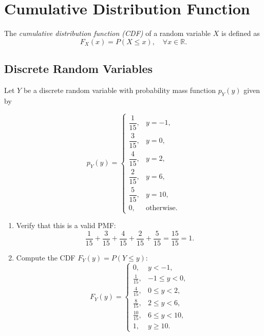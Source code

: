 \section{Cumulative Distribution Function}

\begin{definition}
    The \emph{cumulative distribution function (CDF)} of a random variable \( X \) is defined as
    \[
        F_X(x) = P(X \le x), \quad \forall x \in \mathbb{R}.
    \]
\end{definition}

\subsection{Discrete Random Variables}

\begin{eg}
    Let \(Y\) be a discrete random variable with probability mass function \(p_Y(y)\) given by

    \[
    p_Y(y) =
    \begin{cases}
        \dfrac{1}{15}, & y = -1, \\[3mm]
        \dfrac{3}{15}, & y = 0, \\[3mm]
        \dfrac{4}{15}, & y = 2, \\[3mm]
        \dfrac{2}{15}, & y = 6, \\[3mm]
        \dfrac{5}{15}, & y = 10, \\[3mm]
        0, & \text{otherwise}.
    \end{cases}
    \]

    \begin{enumerate}[label=(\alph*)]
        \item Verify that this is a valid PMF:  
        \[
        \frac{1}{15} + \frac{3}{15} + \frac{4}{15} + \frac{2}{15} + \frac{5}{15} = \frac{15}{15} = 1.
        \]

        \item Compute the CDF \(F_Y(y) = P(Y \le y)\):
        \[
        F_Y(y) =
        \begin{cases}
            0, & y < -1, \\[1mm]
            \frac{1}{15}, & -1 \le y < 0, \\[2mm]
            \frac{4}{15}, & 0 \le y < 2, \\[2mm]
            \frac{8}{15}, & 2 \le y < 6, \\[2mm]
            \frac{10}{15}, & 6 \le y < 10, \\[2mm]
            1, & y \ge 10.
        \end{cases}
        \]
    \end{enumerate}
\end{eg}


